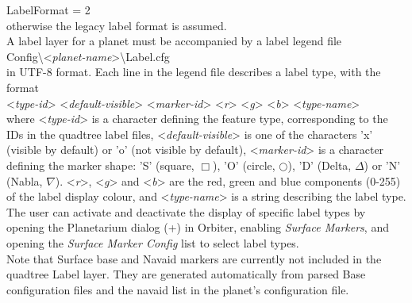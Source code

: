 \documentclass[Orbiter Developer Manual.tex]{subfiles}
\begin{document}
\indent LabelFormat = 2\\
otherwise the legacy label format is assumed.\\
A label layer for a planet must be accompanied by a label legend file\\
\indent Config\textbackslash <\textit{planet-name}>\textbackslash Label.cfg\\
in UTF-8 format. Each line in the legend file describes a label type, with the format\\
\indent <\textit{type-id}> <\textit{default-visible}> <\textit{marker-id}> <\textit{r}> <\textit{g}> <\textit{b}> <\textit{type-name}>\\
where <\textit{type-id}> is a character defining the feature type, corresponding to the IDs in the quadtree label files, <\textit{default-visible}> is one of the characters 'x' (visible by default) or 'o' (not visible by default), <\textit{marker-id}> is a character defining the marker shape: 'S' (square, $\Box$), 'O' (circle, $\bigcirc$), 'D' (Delta, $\Delta$) or 'N' (Nabla, $\nabla$). <\textit{r}>, <\textit{g}> and <\textit{b}> are the red, green and blue components (0-255) of the label display colour, and <\textit{type-name}> is a string describing the label type.\\
The user can activate and deactivate the display of specific label types by opening the Planetarium dialog (\Ctrl+) in Orbiter, enabling \textit{Surface Markers}, and opening the \textit{Surface Marker Config} list to select label types.\\
Note that Surface base and Navaid markers are currently not included in the quadtree Label layer. They are generated automatically from parsed Base configuration files and the navaid list in the planet's configuration file.
\end{document}

